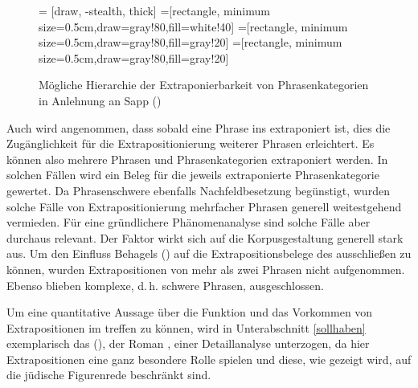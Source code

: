    \begin{figure}
\begin{center}
 = [draw, -stealth, thick]
=[rectangle, minimum size=0.5cm,draw=gray!80,fill=white!40]
=[rectangle, minimum size=0.5cm,draw=gray!80,fill=gray!20]
=[rectangle, minimum size=0.5cm,draw=gray!80,fill=gray!20]

 \end{center}
 \caption{Mögliche Hierarchie der Extraponierbarkeit von Phrasenkategorien in Anlehnung an Sapp (\citeyear[7]{Sapp2014})}\label{EXhirarchie}
 \end{figure}

   
   Auch wird angenommen, dass sobald eine Phrase ins  extraponiert ist, dies die Zugänglichkeit für die Extrapositionierung weiterer Phrasen erleichtert. Es können also mehrere Phrasen und Phrasenkategorien extraponiert werden. In solchen Fällen wird ein Beleg für die jeweils  extraponierte  Phrasenkategorie gewertet. Da Phrasenschwere ebenfalls  Nachfeldbesetzung begünstigt, wurden solche Fälle von Extrapositionierung mehrfacher Phrasen generell weitestgehend vermieden. Für eine gründlichere Phänomenanalyse sind solche Fälle aber durchaus relevant. Der Faktor  wirkt sich auf die Korpusgestaltung generell stark aus. Um den Einfluss Behagels  (\citeyear{Behaghel1909}) auf die Extrapositionsbelege des \hai{{\LiJi}} ausschließen zu können, wurden Extrapositionen von mehr als zwei Phrasen nicht aufgenommen. Ebenso blieben komplexe, d.\,h. schwere Phrasen, ausgeschlossen. 
   
Um eine quantitative  Aussage über die Funktion und das Vorkommen von Extrapositionen im  treffen zu können, wird in Unterabschnitt \ref{sollhaben} exemplarisch das  (\citealt[29]{Becker2005}), der Roman , einer Detaillanalyse unterzogen, da hier Extrapositionen eine ganz besondere Rolle spielen und diese, wie gezeigt wird, auf die jüdische Figurenrede beschränkt sind. 
 
